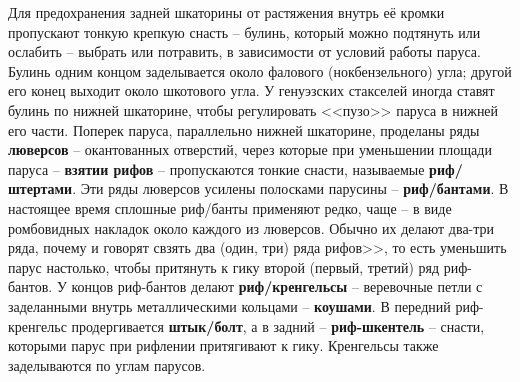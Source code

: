 \documentclass[a4paper, 12pt, twoside, final]{scrbook}
\begin{document}
Для предохранения задней шкаторины от растяжения внутрь её кромки
пропускают тонкую крепкую снасть \--- булинь, который можно подтянуть
или ослабить \--- выбрать или потравить, в зависимости от условий работы
паруса. Булинь одним концом заделывается около фалового (нокбензельного)
угла; другой его конец выходит около шкотового угла. У генуэзских
стакселей иногда ставят булинь по нижней шкаторине, чтобы регулировать
<<пузо>> паруса в нижней его части. Поперек паруса, параллельно нижней
шкаторине, проделаны ряды \textbf{люверсов} \--- окантованных отверстий,
через которые при уменьшении площади паруса \--- \textbf{взятии рифов}
\--- пропускаются тонкие снасти, называемые \textbf{риф\-/штертами}. Эти
ряды люверсов усилены полосками парусины \--- \textbf{риф\-/бантами}. В настоящее
время сплошные риф\-/банты применяют редко, чаще \--- в виде ромбовидных
накладок около каждого из люверсов. Обычно их делают два-три ряда,
почему и говорят свзять два (один, три) ряда рифов>>, то есть уменьшить
парус настолько, чтобы притянуть к гику второй (первый, третий) ряд
риф-бантов. У концов риф-бантов делают \textbf{риф\-/кренгельсы} \--- веревочные
петли с заделанными внутрь металлическими кольцами \--- \textbf{коушами}.
В передний риф-кренгельс продергивается \textbf{штык\-/болт}, а в задний \--- \textbf{риф-шкентель} \--- снасти,
которыми парус при рифлении притягивают к гику. Кренгельсы также заделываются
по углам парусов.
\end{document}

